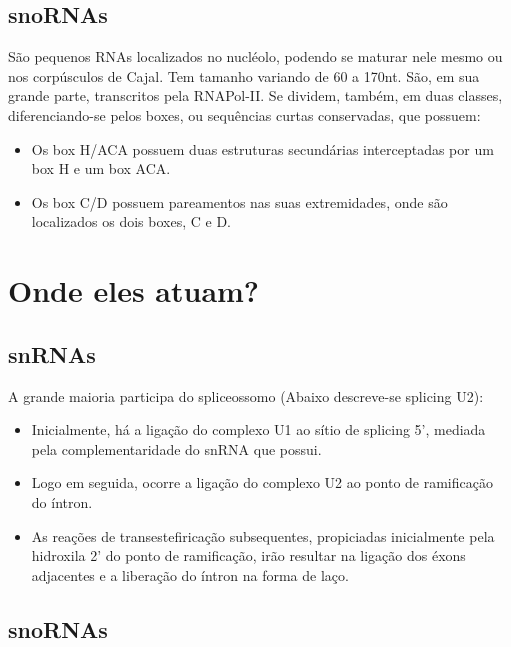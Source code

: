 \documentclass[
]{book}
\begin{document}
\hypertarget{snornas}{%
\subsection{snoRNAs}\label{snornas}}

São pequenos RNAs localizados no nucléolo, podendo se maturar nele mesmo ou nos corpúsculos de Cajal. Tem tamanho variando de 60 a 170nt. São, em sua grande parte, transcritos
pela RNAPol-II. Se dividem, também, em duas classes, diferenciando-se pelos boxes, ou sequências curtas conservadas, que possuem:

\begin{itemize}
\item
  Os box H/ACA possuem duas estruturas secundárias interceptadas por um box H e um box ACA.
\item
  Os box C/D possuem pareamentos nas suas extremidades, onde são localizados os dois boxes, C e D.
\end{itemize}

\hypertarget{onde-eles-atuam}{%
\section{Onde eles atuam?}\label{onde-eles-atuam}}

\hypertarget{snrnas-1}{%
\subsection{snRNAs}\label{snrnas-1}}

A grande maioria participa do spliceossomo (Abaixo descreve-se splicing U2):

\begin{itemize}
\item
  Inicialmente, há a ligação do complexo U1 ao sítio de splicing 5', mediada pela complementaridade do snRNA que possui.
\item
  Logo em seguida, ocorre a ligação do complexo U2 ao ponto de ramificação do íntron.
\item
  As reações de transestefiricação subsequentes, propiciadas inicialmente pela hidroxila 2' do ponto de ramificação, irão resultar na ligação dos éxons adjacentes e a liberação do íntron na forma de laço.
\end{itemize}

\hypertarget{snornas-1}{%
\subsection{snoRNAs}\label{snornas-1}}
\end{document}
